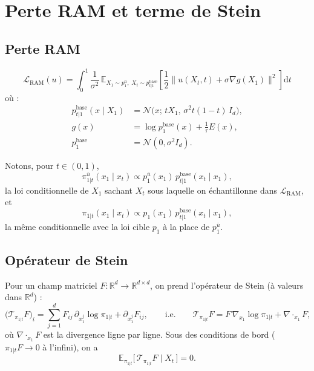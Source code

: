 \documentclass[11pt]{article}
\newcommand{\E}{\mathbb{E}}
\newcommand{\R}{\mathbb{R}}
\newcommand{\N}{\mathcal{N}}
\newcommand{\Id}{I_d}
\newcommand{\dd}{\mathrm{d}}
\newcommand{\ubar}{\bar u}
\newcommand{\pbase}{p^{\mathrm{base}}}
\newcommand{\divg}{\nabla\!\cdot}
\begin{document}
\section{Perte RAM et terme de Stein}

\subsection{Perte RAM}

\begin{equation}
\mathcal{L}_{\mathrm{RAM}}(u)
= \int_0^1 \frac{1}{\sigma^2}\,
\E_{X_1 \sim p_1^{\ubar},\; X_t \sim \pbase_{t|1}}
\left[ \frac{1}{2} \bigl\| u(X_t,t) + \sigma \nabla g(X_1) \bigr\|^2 \right] \dd t
\end{equation}
où :
\begin{align}
\pbase_{t|1}(x \mid X_1) &= \N\bigl(x;\, t X_1,\, \sigma^2 t(1-t)\,\Id\bigr), \\
g(x) &= \log \pbase_1(x) + \frac{1}{\tau} E(x), \\
\pbase_1 &= \N(0, \sigma^2 \Id).
\end{align}

Notons, pour $t \in (0,1)$,
\begin{equation}
\pi_{1|t}^{\ubar}(x_1 \mid x_t) \propto p_1^{\ubar}(x_1)\, \pbase_{t|1}(x_t \mid x_1),
\end{equation}
la loi conditionnelle de $X_1$ sachant $X_t$ sous laquelle on échantillonne dans $\mathcal{L}_{\mathrm{RAM}}$, et
\begin{equation}
\pi_{1|t}(x_1 \mid x_t) \propto p_1(x_1)\, \pbase_{t|1}(x_t \mid x_1),
\end{equation}
la même conditionnelle avec la loi cible $p_1$ à la place de $p_1^{\ubar}$.

\subsection{Opérateur de Stein}

Pour un champ matriciel $F : \R^d \to \R^{d\times d}$, on prend l'opérateur de Stein (à valeurs dans $\R^d$) :
\begin{equation}
\bigl(\mathcal{T}_{\pi_{1|t}} F\bigr)_i
= \sum_{j=1}^d F_{ij}\, \partial_{x_1^j} \log \pi_{1|t} + \partial_{x_1^j} F_{ij},
\qquad\text{i.e.}\qquad
\mathcal{T}_{\pi_{1|t}} F = F\, \nabla_{x_1} \log \pi_{1|t} + \divg_{x_1} F ,
\end{equation}
où $\divg_{x_1} F$ est la divergence ligne par ligne. Sous des conditions de bord ($\pi_{1|t} F \to 0$ à l'infini), on a
\begin{equation}
\E_{\pi_{1|t}}\bigl[\, \mathcal{T}_{\pi_{1|t}} F \mid X_t \,\bigr] = 0 .
\end{equation}
\end{document}
